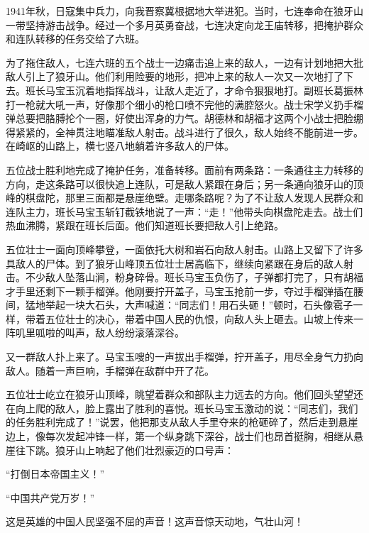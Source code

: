 \documentclass[12pt,UTF-8,openany]{ctexbook}
\begin{document}
\begin{Large}
    
    1941年秋，日寇集中兵力，向我晋察冀根据地大举进犯。当时，七连奉命在狼牙山一带坚持游击战争。经过一个多月英勇奋战，七连决定向龙王庙转移，把掩护群众和连队转移的任务交给了六班。
    
    为了拖住敌人，七连六班的五个战士一边痛击追上来的敌人，一边有计划地把大批敌人引上了狼牙山。他们利用险要的地形，把冲上来的敌人一次又一次地打了下去。班长马宝玉沉着地指挥战斗，让敌人走近了，才命令狠狠地打。副班长葛振林打一枪就大吼一声，好像那个细小的枪口喷不完他的满腔怒火。战士宋学义扔手榴弹总要把胳膊抡个一圈，好使出浑身的力气。胡德林和胡福才这两个小战士把脸绷得紧紧的，全神贯注地瞄准敌人射击。战斗进行了很久，敌人始终不能前进一步。在崎岖的山路上，横七竖八地躺着许多敌人的尸体。
    
    五位战士胜利地完成了掩护任务，准备转移。面前有两条路：一条通往主力转移的方向，走这条路可以很快追上连队，可是敌人紧跟在身后；另一条通向狼牙山的顶峰的棋盘陀，那里三面都是悬崖绝壁。走哪条路呢？为了不让敌人发现人民群众和连队主力，班长马宝玉斩钉截铁地说了一声：“走！”他带头向棋盘陀走去。战士们热血沸腾，紧跟在班长后面。他们知道班长要把敌人引上绝路。
    
    五位壮士一面向顶峰攀登，一面依托大树和岩石向敌人射击。山路上又留下了许多具敌人的尸体。到了狼牙山峰顶五位壮士居高临下，继续向紧跟在身后的敌人射击。不少敌人坠落山涧，粉身碎骨。班长马宝玉负伤了，子弹都打完了，只有胡福才手里还剩下一颗手榴弹。他刚要拧开盖子，马宝玉抢前一步，夺过手榴弹插在腰间，猛地举起一块大石头，大声喊道：“同志们！用石头砸！”顿时，石头像雹子一样，带着五位壮士的决心，带着中国人民的仇恨，向敌人头上砸去。山坡上传来一阵叽里呱啦的叫声，敌人纷纷滚落深谷。
    
    又一群敌人扑上来了。马宝玉嗖的一声拔出手榴弹，拧开盖子，用尽全身气力扔向敌人。随着一声巨响，手榴弹在敌群中开了花。
    
    五位壮士屹立在狼牙山顶峰，眺望着群众和部队主力远去的方向。他们回头望望还在向上爬的敌人，脸上露出了胜利的喜悦。班长马宝玉激动的说：“同志们，我们的任务胜利完成了！”说罢，他把那支从敌人手里夺来的枪砸碎了，然后走到悬崖边上，像每次发起冲锋一样，第一个纵身跳下深谷，战士们也昂首挺胸，相继从悬崖往下跳。狼牙山上响起了他们壮烈豪迈的口号声：
    
    “打倒日本帝国主义！”
    
    “中国共产党万岁！”
    
    这是英雄的中国人民坚强不屈的声音！这声音惊天动地，气壮山河！
    
\end{Large}
\end{document}
